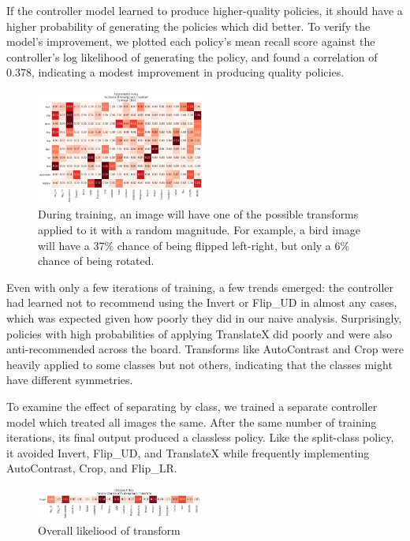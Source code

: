 \documentclass[10pt,twocolumn,letterpaper]{article}
\begin{document}
    If the controller model learned to produce higher-quality policies, it should have a higher probability of generating the policies which did better. To verify the model's improvement, we plotted each policy's mean recall score against the controller's log likelihood of generating the policy, and found a correlation of 0.378, indicating a modest improvement in producing quality policies.
    
    \begin{figure}[h]
    	\begin{center}
    		\includegraphics[width=0.5\textwidth]{splitPolicy.png}
    	\end{center}
    	\caption{During training, an image will have one of the possible transforms applied to it with a random magnitude. For example, a bird image will have a 37\% chance of being flipped left-right, but only a 6\% chance of being rotated.}
    	\label{fig:splitPolicy}
    \end{figure}
    
    Even with only a few iterations of training, a few trends emerged: the controller had learned not to recommend using the Invert or Flip\_UD in almost any cases, which was expected given how poorly they did in our naive analysis. Surprisingly, policies with high probabilities of applying TranslateX did poorly and were also anti-recommended across the board.  Transforms like AutoContrast and Crop were heavily applied to some classes but not others, indicating that the classes might have different symmetries.
    
    To examine the effect of separating by class, we trained a separate controller model which treated all images the same. After the same number of training iterations, its final output produced a classless policy. Like the split-class policy, it avoided Invert, Flip\_UD, and TranslateX while frequently implementing AutoContrast, Crop, and Flip\_LR.
    
    \begin{figure}[h]
    	\begin{center}
    		\includegraphics[width=0.5\textwidth]{classlessPolicy.png}
    	\end{center}
    	\caption{Overall likeliood of transform}
    	\label{fig:classlessPolicy}
    \end{figure}
    
\end{document}
